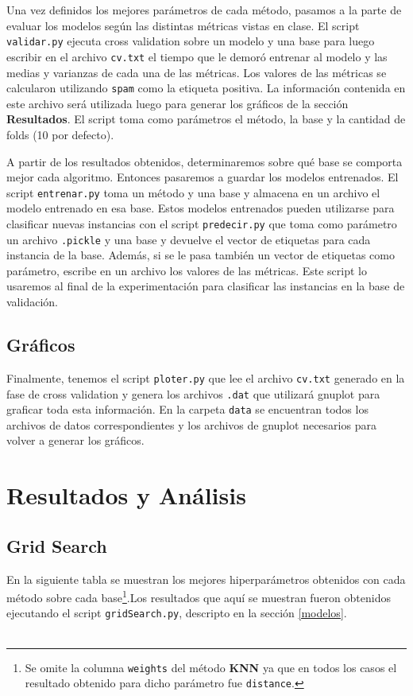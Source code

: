 \documentclass[10pt, a4paper]{article}
\begin{document}
Una vez definidos los mejores parámetros de cada método, pasamos a la parte de evaluar los modelos según las distintas métricas vistas en clase. El script \texttt{validar.py} ejecuta cross validation sobre un modelo y una base para luego escribir en el archivo \texttt{cv.txt} el tiempo que le demoró entrenar al modelo y las medias y varianzas de cada una de las métricas. Los valores de las métricas se calcularon utilizando \texttt{spam} como la etiqueta positiva. La información contenida en este archivo será utilizada luego para generar los gráficos de la sección \textbf{Resultados}. El script toma como parámetros el método, la base y la cantidad de folds (10 por defecto).

A partir de los resultados obtenidos, determinaremos sobre qué base se comporta mejor cada algoritmo. Entonces pasaremos a guardar los modelos entrenados. El script \texttt{entrenar.py} toma un método y una base y almacena en un archivo el modelo entrenado en esa base. Estos modelos entrenados pueden utilizarse para clasificar nuevas instancias con el script \texttt{predecir.py} que toma como parámetro un archivo \texttt{.pickle} y una base y devuelve el vector de etiquetas para cada instancia de la base. Además, si se le pasa también un vector de etiquetas como parámetro, escribe en un archivo los valores de las métricas. Este script lo usaremos al final de la experimentación para clasificar las instancias en la base de validación.

\subsection{Gráficos}

Finalmente, tenemos el script \texttt{ploter.py} que lee el archivo \texttt{cv.txt} generado en la fase de cross validation y genera los archivos \texttt{.dat} que utilizará gnuplot para graficar toda esta información. En la carpeta \texttt{data} se encuentran todos los archivos de datos correspondientes y los archivos de gnuplot necesarios para volver a generar los gráficos.

\section{Resultados y Análisis}

\subsection{Grid Search}
En la siguiente tabla se muestran los mejores hiperparámetros obtenidos con cada método sobre cada base\footnote{Se omite la columna \texttt{weights} del método \textbf{KNN} ya que en todos los casos el resultado obtenido para dicho parámetro fue \texttt{distance}.}.Los resultados que aquí se muestran fueron obtenidos ejecutando el script \texttt{gridSearch.py}, descripto en la sección \ref{modelos}.
\\\\
\end{document}
